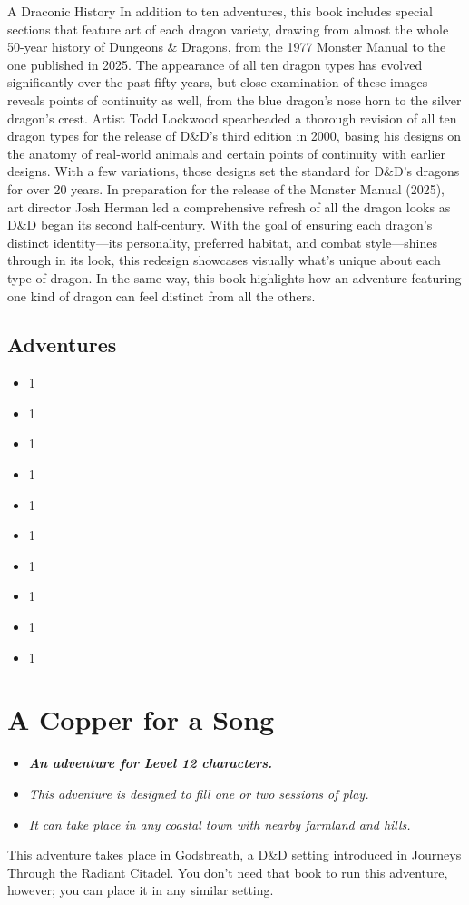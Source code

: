 \documentclass[letterpaper, 11pt, twocolumn]{dndbook}
\begin{document}
\begin{DndSidebar}{A Draconic History}
In addition to ten adventures, this book includes special sections that feature art of each dragon variety, drawing from almost the whole 50-year history of Dungeons \& Dragons, from the 1977 Monster Manual to the one published in 2025. The appearance of all ten dragon types has evolved significantly over the past fifty years, but close examination of these images reveals points of continuity as well, from the blue dragon's nose horn to the silver dragon's crest.
Artist Todd Lockwood spearheaded a thorough revision of all ten dragon types for the release of D\&D's third edition in 2000, basing his designs on the anatomy of real-world animals and certain points of continuity with earlier designs. With a few variations, those designs set the standard for D\&D's dragons for over 20 years.
In preparation for the release of the Monster Manual (2025), art director Josh Herman led a comprehensive refresh of all the dragon looks as D\&D began its second half-century. With the goal of ensuring each dragon's distinct identity---its personality, preferred habitat, and combat style---shines through in its look, this redesign showcases visually what's unique about each type of dragon.
In the same way, this book highlights how an adventure featuring one kind of dragon can feel distinct from all the others.
\end{DndSidebar}
\section{Adventures}

\begin{itemize}
\item 1
\item 1
\item 1
\item 1
\item 1
\item 1
\item 1
\item 1
\item 1
\item 1
\end{itemize}

\chapter{A Copper for a Song}\label{ch:a-copper-for-a-song-2-2}

\begin{itemize}
\item \textit{ \textbf{An adventure for Level 12 characters.}}
\item \textit{This adventure is designed to fill one or two sessions of play.}
\item \textit{It can take place in any coastal town with nearby farmland and hills.}
\end{itemize}
This adventure takes place in Godsbreath, a D\&D setting introduced in Journeys Through the Radiant Citadel. You don't need that book to run this adventure, however; you can place it in any similar setting.
\end{document}
